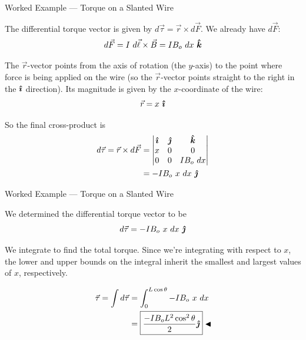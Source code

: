 \documentclass{beamer}
\begin{document}
\begin{frame}{Worked Example --- Torque on a Slanted Wire}

The differential torque vector is given by $d\vec{\tau} = \vec{r} \times d\vec{F}$. We already have $d\vec{F}$:
\begin{equation*}
    d\vec{F} = I\ d\vec{\ell} \times \vec{B} = IB_o\ dx\ \bm{\hat{k}}
\end{equation*}

The $\vec{r}$-vector points from the axis of rotation (the $y$-axis) to the point where force is being applied on the wire (so the $\vec{r}$-vector points straight to the right in the $\bm{\hat{\imath}}$ direction). Its magnitude is given by the $x$-coordinate of the wire:
\begin{equation*}
    \vec{r} = x\ \ihat
\end{equation*}

So the final cross-product is
\begin{align*}
    d\vec{\tau} = \vec{r} \times d\vec{F} &= \begin{vmatrix} \ihat & \jhat & \khat \\ x & 0 & 0 \\ 0 & 0 & I B_o\ dx \end{vmatrix} \\
    &= -I B_o\ x\ dx\ \jhat
\end{align*}

\end{frame}

\begin{frame}{Worked Example --- Torque on a Slanted Wire}

We determined the differential torque vector to be
\begin{equation*}
    d\vec{\tau} = -I B_o\ x\ dx\ \bm{\hat{\jmath}}
\end{equation*}

We integrate to find the total torque. Since we're integrating with respect to $x$, the lower and upper bounds on the integral inherit the smallest and largest values of $x$, respectively.

\begin{align*}
    \vec{\tau} = \int d\vec{\tau} &= \int_0^{L\cos{\theta}} -I B_o\ x\ dx \\
                                  &= \boxed{\frac{-I B_o L^2 \cos^2{\theta}}{2} \jhat} \blacktriangleleft
\end{align*}

\end{frame}
\end{document}
